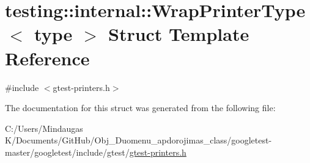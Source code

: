 \hypertarget{structtesting_1_1internal_1_1_wrap_printer_type}{}\section{testing\+::internal\+::Wrap\+Printer\+Type$<$ type $>$ Struct Template Reference}
\label{structtesting_1_1internal_1_1_wrap_printer_type}


{\ttfamily \#include $<$gtest-\/printers.\+h$>$}



The documentation for this struct was generated from the following file\+:\begin{DoxyCompactItemize}
\item 
C\+:/\+Users/\+Mindaugas K/\+Documents/\+Git\+Hub/\+Obj\+\_\+\+Duomenu\+\_\+apdorojimas\+\_\+class/googletest-\/master/googletest/include/gtest/\mbox{\hyperlink{googletest-master_2googletest_2include_2gtest_2gtest-printers_8h}{gtest-\/printers.\+h}}\end{DoxyCompactItemize}
